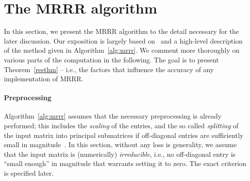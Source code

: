 \documentclass[final]{siamltex}
\begin{document}
\section{The MRRR algorithm}
\label{sec:mrrralgorithm}

In this section, we present the MRRR algorithm to the detail necessary for the
later discussion. 
Our exposition is largely based
on~\cite{Willems:framework,Willems:twisted,Dhillon:2004:MRRR} and a
high-level description of the method given in Algorithm~\ref{alg:mrrr}. We
comment more thoroughly on various parts of the computation in the following.  
The goal is to present
Theorem~\ref{resthm} -- i.e., the factors that influence the accuracy of any
implementation of MRRR.

\paragraph{Preprocessing} Algorithm~\ref{alg:mrrr} assumes that the necessary
preprocessing is already performed; this includes the {\it scaling} of the entries, and
the so called {\it splitting} of the input matrix into principal submatrices
if off-diagonal entries are sufficiently small in
magnitude~\cite{Parlett:1998:SEP}. 
In this section, without any loss is generality, we assume that
the input matrix is (numerically) {\it irreducible}, i.e., 
no off-diagonal entry is ``small enough'' in magnitude that warrants setting it
to zero. The exact criterion is specified later.
\end{document}

